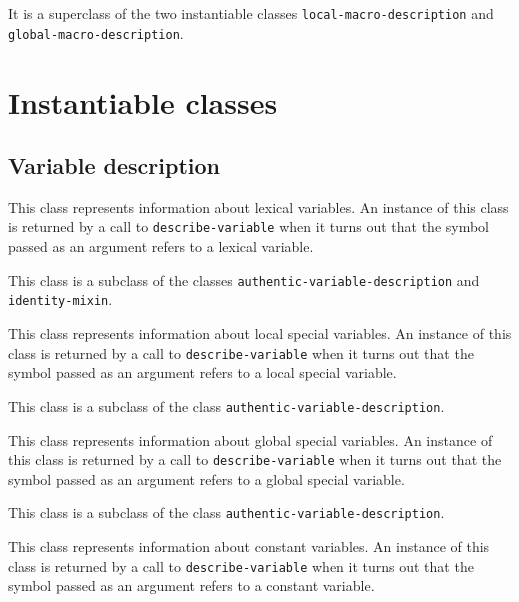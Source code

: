 It is a superclass of the two instantiable classes
\texttt{local-macro-description} and
\texttt{global-macro-description}.

\section{Instantiable classes}
\label{sec-instantiable-query-classes}

\subsection{Variable description}
\label{sec-instantiable-classes-variable-desciption}

{\footnotesize
{}
}

This class represents information about lexical variables.  An
instance of this class is returned by a call to \texttt{describe-variable}
when it turns out that the symbol passed as an argument refers to a
lexical variable.

This class is a subclass of the classes
\texttt{authentic-variable-description} and \texttt{identity-mixin}.

{\footnotesize
{}
}

This class represents information about local special variables.   An
instance of this class is returned by a call to \texttt{describe-variable}
when it turns out that the symbol passed as an argument refers to a
local special variable.

This class is a subclass of the class
\texttt{authentic-variable-description}.

{\footnotesize
{}
}

This class represents information about global special variables.   An
instance of this class is returned by a call to \texttt{describe-variable}
when it turns out that the symbol passed as an argument refers to a
global special variable.

This class is a subclass of the class
\texttt{authentic-variable-description}.

{\footnotesize
{}
}

This class represents information about constant variables.   An
instance of this class is returned by a call to \texttt{describe-variable}
when it turns out that the symbol passed as an argument refers to a
constant variable.


